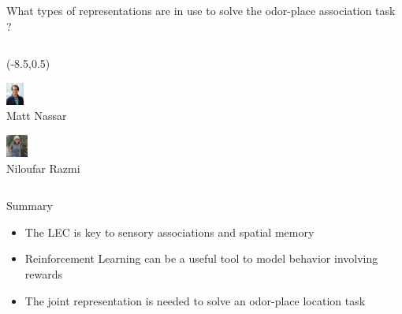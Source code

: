 \documentclass[bigger]{beamer}
\begin{document}
\begin{frame}[label={sec:orgc8b79f6}]{What types of representations are in use to solve the odor-place association task ?}
\begin{columns}
\begin{column}[t]{0.5\columnwidth}
\begin{textblock}{5}(-8.5,0.5)
\begin{minipage}[t]{3em}
\center
\includegraphics[height=2em]{img/matt-nassar.jpg}\\
\scriptsize
Matt Nassar
\end{minipage}
\begin{minipage}[t]{3em}
\center
\includegraphics[height=2em]{img/niloufar-razmi.jpeg}\\
\scriptsize
Niloufar Razmi
\end{minipage}
\end{textblock}
\end{column}
\end{columns}
\end{frame}

\begin{frame}[<+->][label={sec:org2b0d972}]{Summary}
\begin{itemize}
\item The LEC is key to sensory associations and spatial memory
\item Reinforcement Learning can be a useful tool to model behavior involving rewards
\item The joint representation is needed to solve an odor-place location task
\end{itemize}
\end{frame}
\end{document}
